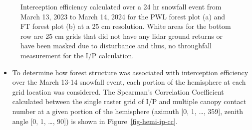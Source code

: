 \documentclass[
  letterpaper,
  DIV=11,
  numbers=noendperiod]{scrartcl}
\providecommand{\tightlist}{%
  \setlength{\itemsep}{0pt}\setlength{\parskip}{0pt}}\usepackage{longtable,booktabs,array}
\begin{document}
\begin{figure}

\begin{minipage}{0.50\linewidth}



\end{minipage}%
%
\begin{minipage}{0.50\linewidth}



\end{minipage}%

\caption{\label{fig-lidar-ip}Interception efficiency calculated over a
24 hr snowfall event from March 13, 2023 to March 14, 2024 for the PWL
forest plot (a) and FT forest plot (b) at a 25 cm resolution. White
areas for the bottom row are 25 cm grids that did not have any lidar
ground returns or have been masked due to disturbance and thus, no
throughfall measurement for the I/P calculation.}

\end{figure}%

\begin{itemize}
\tightlist
\item
  To determine how forest structure was associated with interception
  efficiency over the March 13-14 snowfall event, each portion of the
  hemisphere at each grid location was considered. The Spearman's
  Correlation Coefficient calculated between the single raster grid of
  I/P and multiple canopy contact number at a given portion of the
  hemisphere (azimuth {[}0, 1, \ldots, 359{]}, zenith angle {[}0, 1,
  \ldots, 90{]}) is shown in Figure~\ref{fig-hemi-ip-cc}.
\end{itemize}
\end{document}
